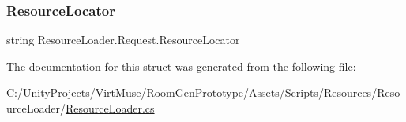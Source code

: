 \subsubsection{\texorpdfstring{Resource\+Locator}{ResourceLocator}}
{\footnotesize\ttfamily string Resource\+Loader.\+Request.\+Resource\+Locator}



The documentation for this struct was generated from the following file\+:\begin{DoxyCompactItemize}
\item 
C\+:/\+Unity\+Projects/\+Virt\+Muse/\+Room\+Gen\+Prototype/\+Assets/\+Scripts/\+Resources/\+Resource\+Loader/\mbox{\hyperlink{_resource_loader_8cs}{Resource\+Loader.\+cs}}\end{DoxyCompactItemize}
